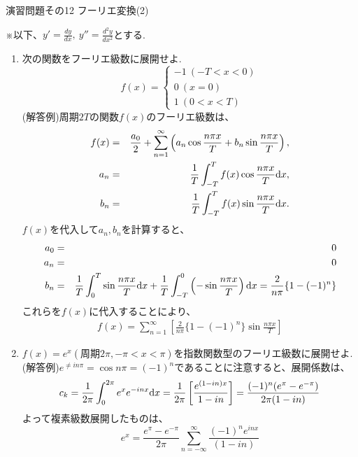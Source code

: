 \documentclass[11pt]{jsarticle}
\begin{document}
\begin{center}
{\Large
演習問題その12  フーリエ変換(2)}
\end{center}
※以下、$y'=\frac{dy}{dx},~y''=\frac{d^2 y}{dx^2}$とする.
\begin{enumerate}

\item 次の関数をフーリエ級数に展開せよ.
\begin{equation*}
 f(x) =
   \begin{cases}
    -1 \ (-T<x<0)\\
    0 \ (x=0)\\
    1 \ (0<x<T)
  \end{cases}
\end{equation*}
(解答例)周期$2T$の関数$f(x)$のフーリエ級数は、
\begin{eqnarray*}
f(x) &=& \frac{a_0}{2} +\sum_{n=1}^{\infty}\left(a_n\cos{\frac{n\pi x}{T}}+b_n\sin{\frac{n\pi x}{T}}\right),\\
a_n &=& \frac{1}{T} \int_{-T}^T f(x)\cos{\frac{n\pi x}{T}}{\rm d}x,\\
b_n &=& \frac{1}{T} \int_{-T}^T f(x)\sin{\frac{n\pi x}{T}}{\rm d}x.
\end{eqnarray*}
$f(x)$を代入して$a_n,b_n$を計算すると、
\begin{eqnarray*}
a_0 &=& 0\\
a_n &=& 0\\
b_n &=& \frac{1}{T}\int_0^T \sin{\frac{n\pi x}{T}}{\rm d}x +\frac{1}{T}\int_{-T}^0 \left(-\sin{\frac{n\pi x}{T}}\right){\rm d}x =\frac{2}{n\pi}\{1-(-1)^n\}
\end{eqnarray*}
これらを$f(x)$に代入することにより、
\begin{eqnarray*}
f(x) = \sum_{n=1}^{\infty}\left[\frac{2}{n\pi}\{1-(-1)^n\}\sin{\frac{n\pi x}{T}} \right]
\end{eqnarray*}
\item $f(x)=e^x(周期2\pi,-\pi<x<\pi)$を指数関数型のフーリエ級数に展開せよ.\\
(解答例)$e^{\neq in\pi}=\cos{n\pi}=(-1)^n$であることに注意すると、展開係数は、
\[c_k = \frac{1}{2\pi}\int_0^{2\pi}e^xe^{-inx}{\rm d}x = \frac{1}{2\pi}\left[\frac{e^{(1-in)x}}{1-in}\right]= \frac{(-1)^n(e^{\pi}-e^{-\pi})}{2\pi (1-in)}\]
よって複素級数展開したものは、
\[e^x=\frac{e^{\pi}-e^{-\pi}}{2\pi}\sum_{n=-\infty}^{\infty}\frac{(-1)^n e^{inx}}{(1-in)}\]


\end{enumerate}
\end{document}
